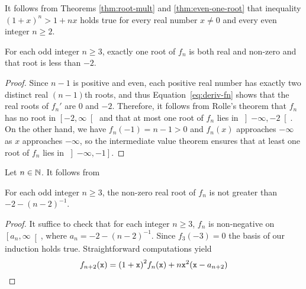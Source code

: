  It follows from
 Theorems \ref{thm:root-mult} and \ref{thm:even-one-root} 
 that inequality ${(1 + x)}^n > 1 + n x$ holds true for every real number $x \ne 0$ and every even integer $n \ge 2$.
 
 \begin{theorem}
   For each odd integer $n \ge 3$,
   exactly one root of $f_n$ is both real and non-zero and that root is less  than $- 2$.
 \end{theorem}

 \begin{proof}
   Since $n - 1$ is positive and even,
   each positive real number has exactly two distinct real $(n - 1)$th roots,
   and thus Equation~\eqref{eq:deriv-fn} shows that the real roots of $f_n'$ are $0$ and $- 2$.
   Therefore, it follows from Rolle's theorem that
   $f_n$ has no root in $\left[- 2, \infty \right[$
   and that
   at most one root of $f_n$ lies in $\left]- \infty, - 2 \right[$.
   On the other hand, we have $f_n(-1) = n - 1 > 0$ and $f_n(x)$ approaches $- \infty$ as $x$ approaches $- \infty$,
   so the intermediate value theorem ensures that at least one root of $f_n$ lies in $\left]- \infty, -1 \right]$.
 \end{proof}

 Let $n \in \mathbb{N}$.
 It follows from  




 \begin{theorem}
   For each odd integer $n \ge 3$,
   the non-zero real root of $f_n$ is not greater than $- 2 - {(n - 2)}^{- 1}$.
 \end{theorem}

 \begin{proof}
   It suffice to check that for each integer $n \ge 3$,
    $f_n$ is non-negative on $\left[a_n, \infty \right[$,
    where $a_n = - 2 - {(n - 2)}^{- 1}$.
    Since $f_3(- 3) = 0$ the basis of our induction holds true.
    Straightforward computations yield 
    $$
    f_{n + 2} (\mathtt{x}) = {(1 + \mathtt{x})}^2 f_n(\mathtt{x}) + n \mathtt{x}^2 (\mathtt{x} - a_{n + 2}) 
    $$
   
 \end{proof} 
 
 

